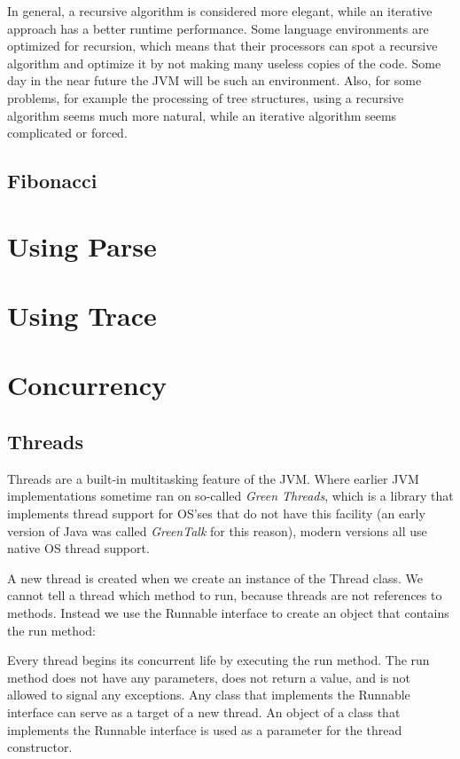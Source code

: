 {In general, a recursive algorithm is considered more elegant, while an
iterative approach has a better runtime performance. Some language
environments are optimized for recursion, which means that their
processors can spot a recursive algorithm and optimize it by not
making many useless copies of the code. Some day in the near future
the JVM will be such an environment. Also, for some problems, for example
the processing of tree structures, using a recursive algorithm seems
much more natural, while an iterative algorithm seems complicated or forced.
\section{Fibonacci}

\chapter{Using Parse}
\chapter{Using Trace}

\chapter{Concurrency}
\section{Threads}
Threads are a built-in multitasking feature of the JVM. Where earlier
JVM implementations sometime ran on so-called \emph{Green Threads},
which is a library that implements thread support for OS'ses that do
not have this facility (an
early version of Java was called \emph{GreenTalk} for this reason), modern versions
all use native OS thread support. 

A new thread is created when we create an instance of the Thread class. We cannot tell a thread which method to run, because threads are not references to methods. Instead we use the Runnable interface to create an object that contains the run method:

Every thread begins its concurrent life by executing the run method. The run method does not have any parameters, does not return a value, and is not allowed to signal any exceptions.
Any class that implements the Runnable interface can serve as a target of a new thread. An object of a class that implements the Runnable interface is used as a parameter for the thread constructor.

}
